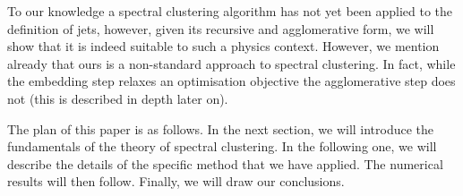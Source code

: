 
To our knowledge a spectral clustering algorithm has not yet been applied to the definition of jets, %
however, given its recursive and agglomerative form, we will show that it is indeed suitable to such a physics context. However, we 
mention already that ours is a non-standard approach to spectral clustering. In fact, while the embedding step relaxes an optimisation objective 
the agglomerative step does not (this is described in depth later on).

The plan of this paper is as follows. In the next section, we will introduce the fundamentals of the theory of spectral clustering. In the following one, we will describe the details of the specific method that we have applied. The numerical results will then follow. Finally, we will draw our conclusions. 
